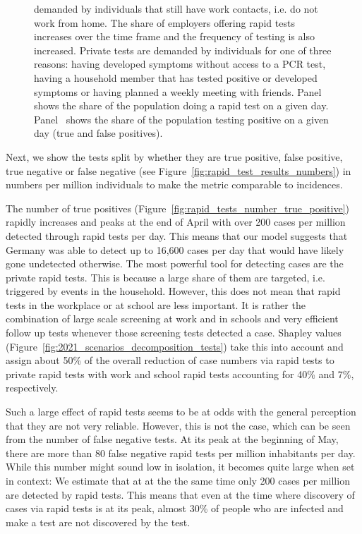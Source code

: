 \begin{figure}[ht]
{        demanded by individuals that still have work contacts, i.e. do not work from
        home. The share of employers offering rapid tests increases over the time frame
        and the frequency of testing is also increased. Private tests are demanded by
        individuals for one of three reasons: having developed symptoms without access
        to a PCR test, having a household member that has tested positive or developed
        symptoms or having planned a weekly meeting with friends.
        Panel~ shows the share of the
        population doing a rapid test on a given day.
        Panel~ shows the share of the population
        testing positive on a given day (true and false positives).}
\end{figure}

\FloatBarrier

Next, we show the tests split by whether they are true positive, false positive, true
negative or false negative (see Figure~\ref{fig:rapid_test_results_numbers}) in numbers
per million individuals to make the metric comparable to incidences.

The number of true positives (Figure~\ref{fig:rapid_tests_number_true_positive}) rapidly
increases and peaks at the end of April with over 200 cases per million detected through
rapid tests per day. This means that our model suggests that Germany was able to detect
up to 16,600 cases per day that would have likely gone undetected otherwise. The most
powerful tool for detecting cases are the private rapid tests. This is because a large
share of them are targeted, i.e. triggered by events in the household. However, this
does not mean that rapid tests in the workplace or at school are less important. It is rather
the combination of large scale screening at work and in schools and very efficient
follow up tests whenever those screening tests detected a case. Shapley values
(Figure~\ref{fig:2021_scenarios_decomposition_tests}) take this into account and
assign about 50\% of the overall reduction of case numbers via rapid tests to private
rapid tests with work and school rapid tests accounting for 40\% and 7\%,
respectively.

Such a large effect of rapid tests seems to be at odds with the general perception that
they are not very reliable. However, this is not the case, which can be seen
from the number of false negative tests. At its peak at the beginning of May, there are
more than 80 false negative rapid tests per million inhabitants per day. While this
number might sound low in isolation, it becomes quite large when set in context: We
estimate that at at the the same time only 200 cases per million are detected by rapid
tests. This means that even at the time where discovery of cases via rapid tests is at
its peak, almost 30\% of people who are infected and make a test are not discovered by
the test.

